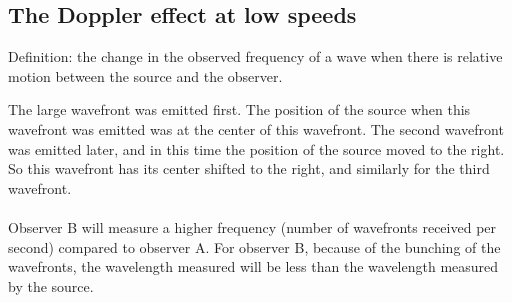 \documentclass[a4paper,12pt]{article}
\begin{document}
\subsection{The Doppler effect at low speeds}
Definition: the change in the observed frequency of a wave when there is relative motion between the source and the observer.
\begin{center}
\end{center}
The large wavefront was emitted first. The position of the source when
this wavefront was emitted was at the center of this wavefront. The second wavefront was emitted later, and in
this time the position of the source moved to the right. So this wavefront has its center shifted to the right, and
similarly for the third wavefront.\\\\
Observer B will measure a higher frequency (number of wavefronts received per second) compared to observer A. For observer B, because of the bunching of the wavefronts, the wavelength measured will be less than the wavelength measured by the source. 
\end{document}
